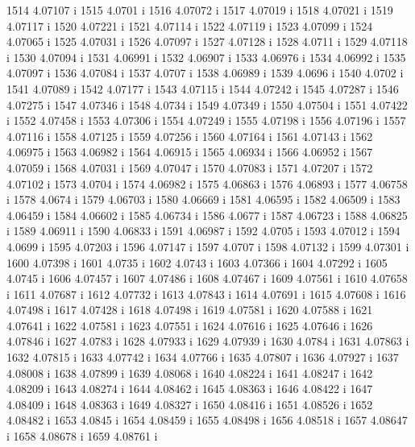  1514  4.07107  i
 1515  4.0701  i
 1516  4.07072  i
 1517  4.07019  i
 1518  4.07021  i
 1519  4.07117  i
 1520  4.07221  i
 1521  4.07114  i
 1522  4.07119  i
 1523  4.07099  i
 1524  4.07065  i
 1525  4.07031  i
 1526  4.07097  i
 1527  4.07128  i
 1528  4.0711  i
 1529  4.07118  i
 1530  4.07094  i
 1531  4.06991  i
 1532  4.06907  i
 1533  4.06976  i
 1534  4.06992  i
 1535  4.07097  i
 1536  4.07084  i
 1537  4.0707  i
 1538  4.06989  i
 1539  4.0696  i
 1540  4.0702  i
 1541  4.07089  i
 1542  4.07177  i
 1543  4.07115  i
 1544  4.07242  i
 1545  4.07287  i
 1546  4.07275  i
 1547  4.07346  i
 1548  4.0734  i
 1549  4.07349  i
 1550  4.07504  i
 1551  4.07422  i
 1552  4.07458  i
 1553  4.07306  i
 1554  4.07249  i
 1555  4.07198  i
 1556  4.07196  i
 1557  4.07116  i
 1558  4.07125  i
 1559  4.07256  i
 1560  4.07164  i
 1561  4.07143  i
 1562  4.06975  i
 1563  4.06982  i
 1564  4.06915  i
 1565  4.06934  i
 1566  4.06952  i
 1567  4.07059  i
 1568  4.07031  i
 1569  4.07047  i
 1570  4.07083  i
 1571  4.07207  i
 1572  4.07102  i
 1573  4.0704  i
 1574  4.06982  i
 1575  4.06863  i
 1576  4.06893  i
 1577  4.06758  i
 1578  4.0674  i
 1579  4.06703  i
 1580  4.06669  i
 1581  4.06595  i
 1582  4.06509  i
 1583  4.06459  i
 1584  4.06602  i
 1585  4.06734  i
 1586  4.0677  i
 1587  4.06723  i
 1588  4.06825  i
 1589  4.06911  i
 1590  4.06833  i
 1591  4.06987  i
 1592  4.0705  i
 1593  4.07012  i
 1594  4.0699  i
 1595  4.07203  i
 1596  4.07147  i
 1597  4.0707  i
 1598  4.07132  i
 1599  4.07301  i
 1600  4.07398  i
 1601  4.0735  i
 1602  4.0743  i
 1603  4.07366  i
 1604  4.07292  i
 1605  4.0745  i
 1606  4.07457  i
 1607  4.07486  i
 1608  4.07467  i
 1609  4.07561  i
 1610  4.07658  i
 1611  4.07687  i
 1612  4.07732  i
 1613  4.07843  i
 1614  4.07691  i
 1615  4.07608  i
 1616  4.07498  i
 1617  4.07428  i
 1618  4.07498  i
 1619  4.07581  i
 1620  4.07588  i
 1621  4.07641  i
 1622  4.07581  i
 1623  4.07551  i
 1624  4.07616  i
 1625  4.07646  i
 1626  4.07846  i
 1627  4.0783  i
 1628  4.07933  i
 1629  4.07939  i
 1630  4.0784  i
 1631  4.07863  i
 1632  4.07815  i
 1633  4.07742  i
 1634  4.07766  i
 1635  4.07807  i
 1636  4.07927  i
 1637  4.08008  i
 1638  4.07899  i
 1639  4.08068  i
 1640  4.08224  i
 1641  4.08247  i
 1642  4.08209  i
 1643  4.08274  i
 1644  4.08462  i
 1645  4.08363  i
 1646  4.08422  i
 1647  4.08409  i
 1648  4.08363  i
 1649  4.08327  i
 1650  4.08416  i
 1651  4.08526  i
 1652  4.08482  i
 1653  4.0845  i
 1654  4.08459  i
 1655  4.08498  i
 1656  4.08518  i
 1657  4.08647  i
 1658  4.08678  i
 1659  4.08761  i
